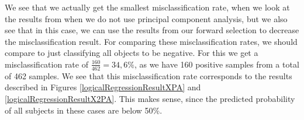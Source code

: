 We see that we actually get the smallest misclassification rate, when we look at the results from when we do not use principal component analysis, but we also see that in this case, we can use the results from our forward selection to decrease the misclassification result. For comparing these misclassification rates, we should compare to just classifying all objects to be negative. For this we get a misclassification rate of $\frac{160}{462}=34,6\%$, as we have 160 positive samples from a total of 462 samples. We see that this misclassification rate corresponds to the results described in Figures \ref{logicalRegressionResultXPA} and \ref{logicalRegressionResultX2PA}. This makes sense, since the predicted probability of all subjects in these cases are below 50\%.